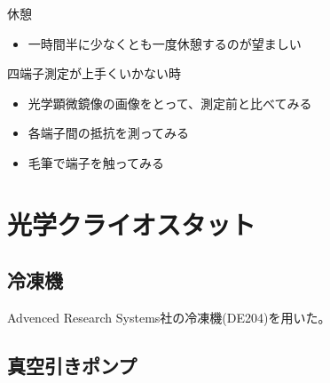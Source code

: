 \documentclass[11pt,a4paper]{jsarticle}
\begin{document}
休憩
\begin{itemize}
\item 一時間半に少なくとも一度休憩するのが望ましい
\end{itemize}

四端子測定が上手くいかない時
\begin{itemize}
\item 光学顕微鏡像の画像をとって、測定前と比べてみる
\item 各端子間の抵抗を測ってみる
\item 毛筆で端子を触ってみる
\end{itemize}

\section{光学クライオスタット}
\subsection{冷凍機}
Advenced Research Systems社の冷凍機(DE204)を用いた。

\subsection{真空引きポンプ}


\newpage


\end{document}
